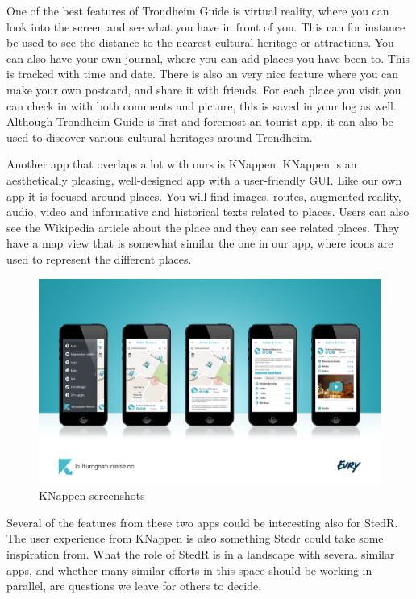 One of the best features of Trondheim Guide is virtual reality, where you can look into the screen and see what you have in front of you. This can for instance be used to see the distance to the nearest cultural heritage or attractions. You can also have your own journal, where you can add places you have been to. This is tracked with time and date. There is also an very nice feature where you can make your own postcard, and share it with friends. For each place you visit you can check in with both comments and picture, this is saved in your log as well. Although Trondheim Guide is first and foremost an tourist app, it can also be used to discover various cultural heritages around Trondheim.

Another app that overlaps a lot with ours is KNappen. KNappen is an aesthetically pleasing, well-designed app with a user-friendly GUI. Like our own app it is focused around places. You will find images, routes, augmented reality, audio, video and informative and historical texts related to places. Users can also see the Wikipedia article about the place and they can see related places. They have a map view that is somewhat similar the one in our app, where icons are used to represent the different places.


\begin{figure}[h!]
\begin{center}
\includegraphics[width=1\textwidth]{res/image02.png}
\caption{KNappen screenshots}
\end{center}
\end{figure}


Several of the features from these two apps could be interesting also for StedR. The user experience from KNappen is also something Stedr could take some inspiration from. What the role of StedR is in a landscape with several similar apps, and whether many similar efforts in this space should be working in parallel, are questions we leave for others to decide.
